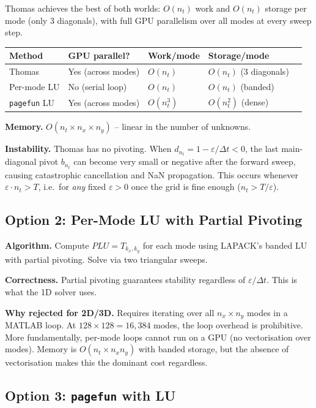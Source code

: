 \documentclass[11pt]{article}
\newcommand{\eps}{\varepsilon}
\newcommand{\dt}{\Delta t}
\begin{document}
Thomas achieves the best of both worlds: $O(n_t)$ work and $O(n_t)$ storage per mode
(only 3 diagonals), with full GPU parallelism over all modes at every sweep step.

\begin{center}
\renewcommand{\arraystretch}{1.3}
\begin{tabular}{lllll}
\toprule
\textbf{Method} & \textbf{GPU parallel?} & \textbf{Work/mode} & \textbf{Storage/mode} \\
\midrule
Thomas           & Yes (across modes) & $O(n_t)$   & $O(n_t)$ (3 diagonals) \\
Per-mode LU      & No (serial loop)   & $O(n_t)$   & $O(n_t)$ (banded)      \\
\texttt{pagefun} LU & Yes (across modes) & $O(n_t^3)$ & $O(n_t^2)$ (dense)  \\
\bottomrule
\end{tabular}
\end{center}

\textbf{Memory.}
$O(n_t \times n_x \times n_y)$ -- linear in the number of unknowns.

\textbf{Instability.}
Thomas has no pivoting. When $d_{n_t} = 1 - \eps/\dt < 0$, the last main-diagonal
pivot $b_{n_t}$ can become very small or negative after the forward sweep,
causing catastrophic cancellation and NaN propagation.
This occurs whenever $\eps \cdot n_t > T$, i.e.\ for \textit{any} fixed $\eps > 0$
once the grid is fine enough ($n_t > T/\eps$).

\subsection{Option 2: Per-Mode LU with Partial Pivoting}

\textbf{Algorithm.}
Compute $P L U = T_{k_x,k_y}$ for each mode using LAPACK's banded LU with partial
pivoting. Solve via two triangular sweeps.

\textbf{Correctness.}
Partial pivoting guarantees stability regardless of $\eps/\dt$.
This is what the 1D solver uses.

\textbf{Why rejected for 2D/3D.}
Requires iterating over all $n_x \times n_y$ modes in a MATLAB loop.
At $128 \times 128 = 16{,}384$ modes, the loop overhead is prohibitive.
More fundamentally, per-mode loops cannot run on a GPU (no vectorisation over modes).
Memory is $O(n_t \times n_x n_y)$ with banded storage, but the absence of vectorisation
makes this the dominant cost regardless.

\subsection{Option 3: \texttt{pagefun} with LU}
\end{document}
